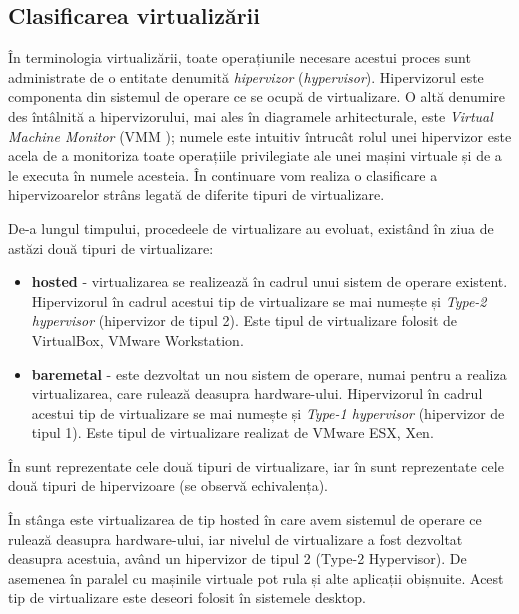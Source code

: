 \subsection{Clasificarea virtualizării}
\label{sec:vm:concepts:class}

În terminologia virtualizării, toate operațiunile necesare acestui proces sunt
administrate de o entitate denumită \textit{hipervizor} (\textit{hypervisor}). Hipervizorul este componenta din sistemul de operare ce se ocupă de
virtualizare. O altă denumire des întâlnită a hipervizorului, mai ales în
diagramele arhitecturale, este \textit{Virtual Machine Monitor} (VMM
); numele este intuitiv întrucât rolul
unei hipervizor este acela de a monitoriza toate operațiile privilegiate ale
unei mașini virtuale și de a le executa în numele acesteia. În continuare vom
realiza o clasificare a hipervizoarelor strâns legată de diferite tipuri de
virtualizare.

De-a lungul timpului, procedeele de virtualizare au evoluat, existând în ziua de
astăzi două tipuri de virtualizare:

\begin{itemize}
  \item \textbf{hosted} - virtualizarea se realizează în cadrul unui sistem de
		operare existent. Hipervizorul în cadrul acestui tip de
		virtualizare se mai numește și \textit{Type-2 hypervisor}
		(hipervizor de tipul 2). Este tipul de virtualizare folosit de VirtualBox, VMware Workstation.
  \item \textbf{baremetal} - este dezvoltat un nou sistem de operare, numai pentru
		a realiza virtualizarea, care rulează deasupra hardware-ului.
		Hipervizorul în cadrul acestui tip de virtualizare se mai
		numește și \textit{Type-1 hypervisor} (hipervizor de tipul 1). Este tipul de virtualizare realizat de VMware ESX, Xen.
\end{itemize}

În  sunt reprezentate cele două tipuri
de virtualizare, iar în  sunt
reprezentate cele două tipuri de hipervizoare (se observă echivalența).

În stânga este
virtualizarea de tip hosted în care avem sistemul de operare ce rulează deasupra
hardware-ului, iar nivelul de virtualizare a fost dezvoltat deasupra acestuia,
având un hipervizor de tipul 2 (Type-2 Hypervisor). De asemenea în paralel cu
mașinile virtuale pot rula și alte aplicații obișnuite. Acest tip de
virtualizare este deseori folosit în sistemele desktop.

